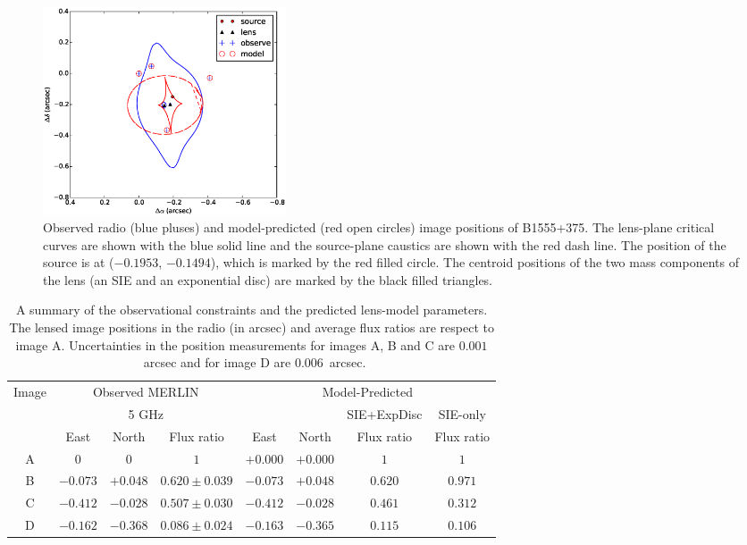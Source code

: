 \documentclass[a4paper,fleqn,usenatbib,useAMS]{mnras}
\begin{document}
\begin{figure}
\includegraphics[width=72mm]{gravlens_exp_try5_plot.eps}
\caption{Observed radio (blue pluses) and model-predicted (red open circles) image positions of B1555+375. The lens-plane critical curves are shown with the blue solid line and the source-plane caustics are shown with the red dash line. The position of the source is at ($-0.1953$, $-0.1494$), which is marked by the red filled circle. The centroid positions of the two mass components of the lens (an SIE and an exponential disc) are marked by the black filled triangles.}
\label{fig:model}
\end{figure}

\begin{table}
\centering
\caption{A summary of the observational constraints and the predicted lens-model parameters. The lensed image positions in the radio \citep{Marlow99} (in arcsec) and average flux ratios \citep{K03} are respect to image A. Uncertainties in the position measurements for images A, B and C are $0.001$~arcsec and for image D are $0.006$~arcsec.}
\begin{tabular}{cccccccc}
\hline
Image	&\multicolumn{3}{c}{Observed MERLIN} 	 	& \multicolumn{4}{c}{Model-Predicted}\\
		&\multicolumn{3}{c}{5 GHz}		& & & {SIE+ExpDisc} & SIE-only\\
		&East &North & Flux ratio &East 	&North & Flux ratio &Flux ratio\\ 
\hline
A  &$0$    		&$0$			&  $1$ 				&$+0.000$  &$+0.000$	& $1$ 		& $1$\\  
B  &$-0.073$	&$+0.048$	& $0.620 \pm 0.039$ 	&$-0.073$ &$+0.048$		& $0.620$ 	& $0.971$ \\  
C  &$-0.412$ 	&$-0.028$	& $0.507\pm 0.030$	&$-0.412$ &$-0.028$		& $0.461$ 	& $0.312$\\  
D  &$-0.162$	&$-0.368$	& $0.086 \pm 0.024$ 	&$-0.163$ &$-0.365$		& $0.115$ 	& $0.106$\\  
\hline
\end{tabular}
\label{tab:results}
\end{table}
\end{document}
